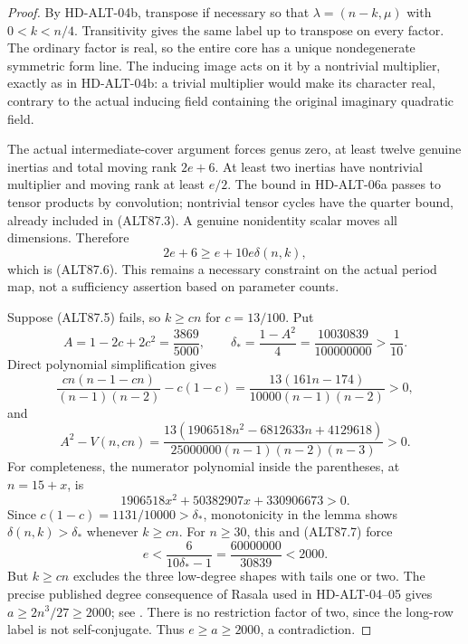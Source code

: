 \begin{proof}
By HD-ALT-04b, transpose if necessary so that $\lambda=(n-k,\mu)$
with $0<k<n/4$. Transitivity gives the same label up to transpose
on every factor. The ordinary factor is real, so the entire core has
a unique nondegenerate symmetric form line. The inducing image acts
on it by a nontrivial multiplier, exactly as in HD-ALT-04b: a trivial
multiplier would make its character real, contrary to the actual
inducing field containing the original imaginary quadratic field.

The actual intermediate-cover argument forces genus zero, at least
twelve genuine inertias and total moving rank $2e+6$. At least two
inertias have nontrivial multiplier and moving rank at least $e/2$.
The bound in HD-ALT-06a passes to tensor products by convolution;
nontrivial tensor cycles have the quarter bound, already included
in (ALT87.3). A genuine nonidentity scalar moves all dimensions.
Therefore
\[
                   2e+6\ge e+10e\delta(n,k),                \tag{ALT87.7}
\]
which is (ALT87.6). This remains a necessary constraint on the actual
period map, not a sufficiency assertion based on parameter counts.

Suppose (ALT87.5) fails, so $k\ge cn$ for $c=13/100$.
Put
\[
 A=1-2c+2c^2=\frac{3869}{5000},\qquad
 \delta_* =\frac{1-A^2}4=\frac{10030839}{100000000}>\frac1{10}.
                                                               \tag{ALT87.8}
\]
Direct polynomial simplification gives
\[
 \frac{cn(n-1-cn)}{(n-1)(n-2)}-c(1-c)
       =\frac{13(161n-174)}{10000(n-1)(n-2)}>0,             \tag{ALT87.9}
\]
and
\[
 A^2-V(n,cn)=
 \frac{13(1906518n^2-6812633n+4129618)}
              {25000000(n-1)(n-2)(n-3)}>0.                \tag{ALT87.10}
\]
For completeness, the numerator polynomial inside the parentheses,
at $n=15+x$, is
\[
              1906518x^2+50382907x+330906673>0.
\]
Since $c(1-c)=1131/10000>\delta_*$, monotonicity in the lemma
shows $\delta(n,k)>\delta_*$ whenever $k\ge cn$.
For $n\ge30$, this and (ALT87.7) force
\[
                  e<\frac{6}{10\delta_*-1}
                     =\frac{60000000}{30839}<2000.         \tag{ALT87.11}
\]
But $k\ge cn$ excludes the three low-degree shapes with tails one
or two. The precise published degree consequence of Rasala used
in HD-ALT-04--05 gives
$a\ge2n^3/27\ge2000$; see
\cite[proof of Theorem~9.7, p.~312]{HD:GKT2019}.
There is no restriction factor of two, since the long-row label is
not self-conjugate. Thus $e\ge a\ge2000$, a contradiction.


\end{proof}
